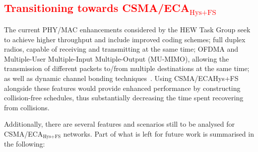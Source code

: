 \textcolor{red}{\section{Transitioning towards CSMA/ECA$_{\text{Hys+FS}}$}\label{ECAtoCA}}


The current PHY/MAC enhancements considered by the HEW Task Group seek to achieve higher throughput and include improved coding schemes; full duplex radios, capable of receiving and transmitting at the same time; OFDMA and Multiple-User Multiple-Input Multiple-Output (MU-MIMO), allowing the transmission of different packets to/from multiple destinations at the same time; as well as dynamic channel bonding techniques~\cite{BorisChannelBonding}. Using CSMA/ECAHys+FS alongside these features would provide enhanced performance by constructing collision-free schedules, thus substantially decreasing the time spent recovering from collisions. 



Additionally, there are several features and scenarios still to be analysed for CSMA/ECA$_{\text{Hys+FS}}$ networks. Part of what is left for future work is summarised in the following:


